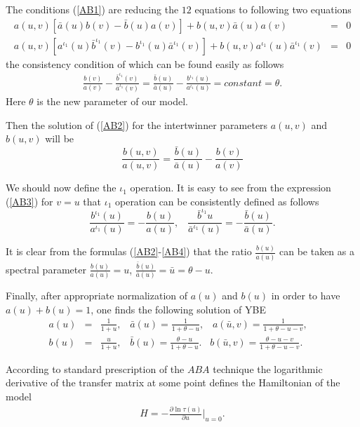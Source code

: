 \documentclass[a4paper,12pt]{article}
\begin{document}
The conditions (\ref{AB1}) are reducing the $12$ equations to
following two equations
\begin{eqnarray}
\label{AB2}
a(u,v) [\bar{a}(u)b(v)-\bar{b}(u)a(v)]+b(u,v)\bar{a}(u)a(v)&=&0 
\nonumber\\
a(u,v) [a^{\iota_1}(u)\bar{b}^{\iota_1}(v)-b^{\iota_1}(u)\bar{a}^{\iota_1}(v)]+
b(u,v)a^{\iota_1}(u)\bar{a}^{\iota_1}(v)&=&0
\end{eqnarray}
the consistency condition of which can be found easily as follows
\begin{eqnarray}
\label{AB3}
\frac{b(v)}{a(v)}-\frac{\bar{b}^{\iota_1}(v)}{\bar{a}^{\iota_1}(v)}=
\frac{\bar{b}(u)}{\bar{a}(u)}-\frac{b^{\iota_1}(u)}{a^{\iota_1}(u)}=
constant=\theta.
\end{eqnarray}
Here $\theta$ is the new parameter of our model.

Then the solution of (\ref{AB2}) for the intertwinner parameters 
$a(u,v)$ and $b(u,v)$ will be
\begin{equation}
\label{AB4}
\frac{b(u,v)}{a(u,v)}=\frac{\bar{b}(u)}{\bar{a}(u)}-\frac{b(v)}{a(v)}
\end{equation}

We should now define the $\iota_1$ operation. It is easy to see from
the expression (\ref{AB3}) for $v=u$ that $\iota_1$ operation can be consistently 
defined as follows
\begin{equation}
\label{AB5}
\frac{b^{\iota_1}(u)}{a^{\iota_1}(u)}=-\frac{b(u)}{a(u)},\;\;\;
\frac{\bar{b}^{\iota_1}{u}}{\bar{a}^{\iota_1}(u)}=
-\frac{\bar{b}(u)}{\bar{a}(u)}.
\end{equation} 

It is clear from the formulas (\ref{AB2}-\ref{AB4}) that the ratio
$\frac{b(u)}{a(u)}$ can be taken as a spectral parameter
$\frac{b(u)}{a(u)}=u$, $\frac{\bar{b}(u)}{\bar{a}(u)}=\bar{u}=
\theta-u.$

Finally, after appropriate normalization of $a(u)$ and $b(u)$ in
order to have $a(u)+b(u)=1$, one finds the following
solution of YBE
\begin{eqnarray}
\label{Sab}
a(u)&=&\frac{1}{1+u},\;\;\;\bar{a}(u)=\frac{1}{1+\theta-u},\;\;\;
a(\bar{u},v)=\frac{1}{1+\theta-u-v},\;\;\; \nonumber\\
b(u)&=&\frac{u}{1+u},\;\;\;\bar{b}(u)=\frac{\theta-u}{1+\theta-u}.\;\;\;
b(\bar{u},v)=\frac{\theta-u-v}{1+\theta-u-v}.
\end{eqnarray}

According to standard prescription of the $ABA$ technique the
logarithmic derivative of the transfer matrix at some point defines 
the Hamiltonian of the model
\begin{eqnarray}
\label{H1}
H=-\frac{\partial {\ln{\tau(u)}}}{\partial{u}}|_{u=0}.
\end{eqnarray} 
\end{document}
